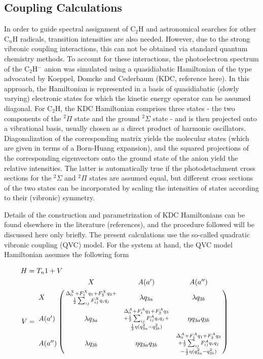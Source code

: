 \documentclass[journal=jpcafh,manuscript=article,layout=onecolumn, 12pt]{achemso}
\begin{document}
\subsection{Coupling Calculations}
In order to guide spectral assignment of C$_2$H and astronomical searches for other C$_n$H radicals, transition intensities are also needed. However, due to the strong vibronic coupling interactions, this can not be obtained via standard quantum chemistry methods. To account for these interactions, the photoelectron spectrum of the C$_2$H$^-$ anion was simulated using a quasidiabatic Hamiltonian of the type advocated by Koeppel, Domcke and Cederbaum (KDC, reference here).   In this approach, the Hamiltonian is represented in a basis of quasidiabatic (slowly varying) electronic  states for which the kinetic energy operator can be assumed diagonal.   For C$_2$H, the KDC Hamiltonian comprises three states - the two components of the $^2\Pi$ state and the ground $^2\Sigma$ state - and is then projected onto a vibrational basis, usually chosen as a direct product of harmonic oscillators.  Diagonalization of the corresponding matrix yields the molecular states (which are given in terms of a Born-Huang expansion), and the squared projections of the corresponding eigenvectors onto the ground state of the anion yield the relative intensities. The latter is automatically true if the photodetachment cross sections for the $^2\Sigma$ and $^2\Pi$ states are assumed equal, but different cross sections of the two states can be incorporated by scaling the intensities of states according to their (vibronic) symmetry. 

Details of the construction and parametrization of KDC Hamiltonians can be found elsewhere in the literature (references), and the procedure followed will be discussed here only briefly.   The present calculations use the so-called quadratic vibronic coupling (QVC) model.  For the system at hand, the QVC model Hamiltonian  assumes the following form

\begin{align}
H &= T_n1+V\\
V &= \bordermatrix{ & X & A(a') & A(a'') \cr
	X &\substack{\Delta_0^X+F_1^Xq_1+F_3^Xq_3+\\ 
		\frac{1}{2} \sum_{ij}F^X_{ij}q_iq_j}& \lambda q_{3a} & \lambda q_{3b} \cr
	A(a') & \lambda q_{3a} & \substack{\Delta^A_0+F^A_1q_1+F^A_3q_3\\+\frac{1}{2}\sum_{ij}F^A_{ij}q_iq_j+\\\frac{1}{2}\eta(q_{3a}^2-q_{3b}^2)} & \eta q_{3a}q_{3b} \cr
	A(a'') & \lambda q_{3b} & \eta q_{3a}q_{3b} & \substack{\Delta_0^A+F_1^Aq_1+F_3^Aq_3\\+\frac{1}{2}\sum_{ij}F_{ij}^Aq_iq_j\\-\frac{1}{2}\eta(q_{3a}^2-q_{3b}^2) } } \qquad
\label{eq:calc1}
\end{align}
\end{document}
